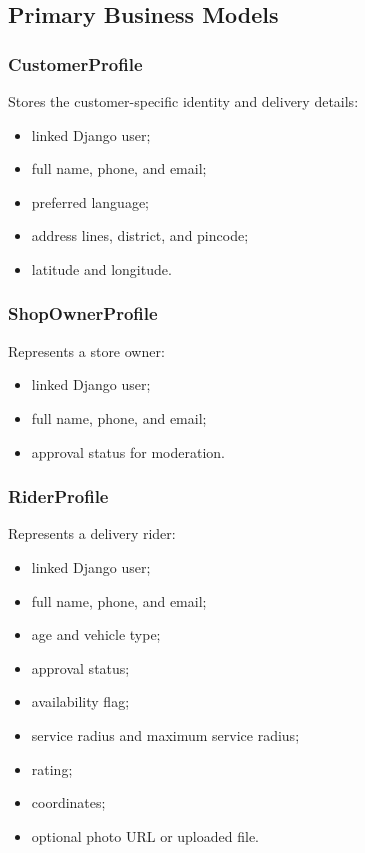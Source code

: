 \documentclass[12pt,a4paper]{article}
\begin{document}
\subsection{Primary Business Models}
\subsubsection{CustomerProfile}
Stores the customer-specific identity and delivery details:
\begin{itemize}[leftmargin=1.5em]
    \item linked Django user;
    \item full name, phone, and email;
    \item preferred language;
    \item address lines, district, and pincode;
    \item latitude and longitude.
\end{itemize}

\subsubsection{ShopOwnerProfile}
Represents a store owner:
\begin{itemize}[leftmargin=1.5em]
    \item linked Django user;
    \item full name, phone, and email;
    \item approval status for moderation.
\end{itemize}

\subsubsection{RiderProfile}
Represents a delivery rider:
\begin{itemize}[leftmargin=1.5em]
    \item linked Django user;
    \item full name, phone, and email;
    \item age and vehicle type;
    \item approval status;
    \item availability flag;
    \item service radius and maximum service radius;
    \item rating;
    \item coordinates;
    \item optional photo URL or uploaded file.
\end{itemize}
\end{document}
